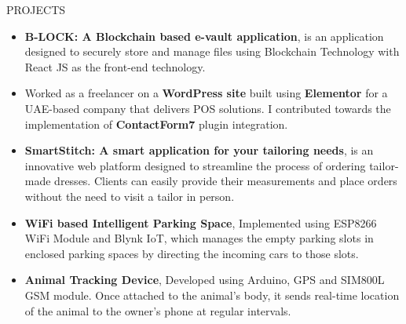 \documentclass{resume} %
\begin{document}
\begin{rSection}{PROJECTS}
    \begin{itemize}

        \item \textbf{B-LOCK: A Blockchain based e-vault application}{, is
                  an application designed to securely store and manage
                  files using Blockchain Technology with React JS as the front-end technology.
              }

        \item Worked as a freelancer on a \textbf{WordPress site} built using \textbf{Elementor} for a UAE-based company that delivers POS solutions. I contributed towards the implementation of \textbf{ContactForm7} plugin integration.


                \item \textbf{SmartStitch: A smart application for your tailoring needs}{, is an innovative web platform designed to streamline the process of ordering tailor-made dresses. Clients can easily provide their measurements and place orders without the need to visit a tailor in person.}



              \item \textbf{WiFi based Intelligent Parking Space}{, Implemented using ESP8266 WiFi Module and Blynk IoT, which manages the empty parking slots in enclosed parking spaces by directing the incoming cars to those slots.}
              \item \textbf{Animal Tracking Device}{, Developed using Arduino, GPS and SIM800L GSM module. Once attached to the animal's body, it sends real-time location of the animal to the owner's phone at regular intervals.}
    \end{itemize}


\end{rSection}
\end{document}
